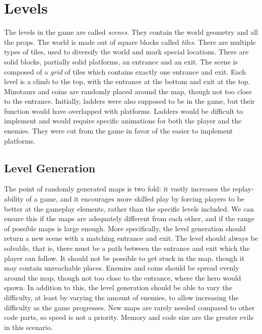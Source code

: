 \section{Levels} %
The levels in the game are called \emph{scenes}. They contain the world geometry and all the props. The world is made out of square blocks called \emph{tiles}. There are multiple types of tiles, used to diversify the world and mark special locations. There are solid blocks, partially solid platforms, an entrance and an exit. The scene is composed of a \emph{grid} of tiles which contains exactly one entrance and exit. Each level is a climb to the top, with the entrance at the bottom and exit at the top. Minotaurs and coins are randomly placed around the map, though not too close to the entrance.
\newline
Initially, ladders were also supposed to be in the game, but their function would have overlapped with platforms. Ladders would be difficult to implement and would require specific animations for both the player and the enemies. They were cut from the game in favor of the easier to implement platforms.

\subsection*{Level Generation} %
The point of randomly generated maps is two fold: it vastly increases the replay-ability of a game, and it encourages more skilled play by forcing players to be better at the gameplay elements, rather than the specific levels included. We can ensure this if the maps are adequately different from each other, and if the range of possible maps is large enough. %
\newline
More specifically, the level generation should return a new scene with a matching entrance and exit. The level should always be solvable, that is, there must be a path between the entrance and exit which the player can follow. It should not be possible to get stuck in the map, though it may contain unreachable places. Enemies and coins should be spread evenly around the map, though not too close to the entrance, where the hero would spawn. In addition to this, the level generation should be able to vary the difficulty, at least by varying the amount of enemies, to allow increasing the difficulty as the game progresses. %
\newline
New maps are rarely needed compared to other code parts, so speed is not a priority. Memory and code size are the greater evils in this scenario.

